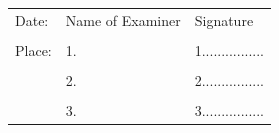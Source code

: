 \documentclass[12pt]{report}
\begin{document}
\vfill
\begin{flushleft}
\begin{tabular}{p{2in} p{2in} l} 
Date: & Name of Examiner & Signature\\
 & &\\
Place: & 1.  & 1................\\
& &\\ 
& 2. & 2................\\
& &\\ 
& 3. & 3................\\
\end{tabular}
\end{flushleft}
\end{document}
